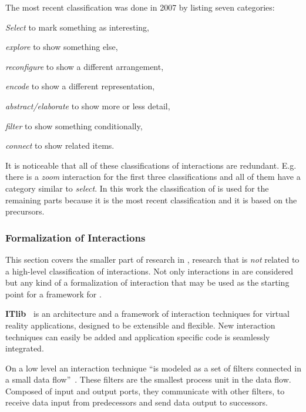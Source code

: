 The most recent classification was done in 2007 by \textcite{Yi2007} listing seven categories:
\begin{enumerate*}[label=(\arabic*)]
  \item
    \emph{Select} to mark something as interesting,
  \item
    \emph{explore} to show something else,
  \item
    \emph{reconfigure} to show a different arrangement,
  \item
    \emph{encode} to show a different representation,
  \item
    \emph{abstract/elaborate} to show more or less detail,
  \item
    \emph{filter} to show something conditionally,
  \item
    \emph{connect} to show related items.
\end{enumerate*}

It is noticeable that all of these classifications of interactions are redundant.
E.g. there is a \emph{zoom} interaction for the first three classifications and all of them have a category similar to \emph{select}.
In this work the classification of \textcite{Yi2007} is used for the remaining parts because it is the most recent classification and it is based on the precursors.

\subsubsection{Formalization of Interactions}

This section covers the smaller part of research in \cmvs{}, research that is \emph{not} related to a high-level classification of interactions.
Not only interactions in \cmvs{} are considered but any kind of a formalization of interaction that may be used as the starting point for a framework for \cmvs{}.

\textbf{ITlib~\parencite{Figueroa2001}} is an architecture and a framework of interaction techniques for virtual reality applications, designed to be extensible and flexible.
New interaction techniques can easily be added and application specific code is seamlessly integrated.

On a low level an interaction technique ``is modeled as a set of filters connected in a small data flow''~\parencite[p.~2]{Figueroa2001}.
These filters are the smallest process unit in the data flow.
Composed of input and output ports, they communicate with other filters, to receive data input from predecessors and send data output to successors.

